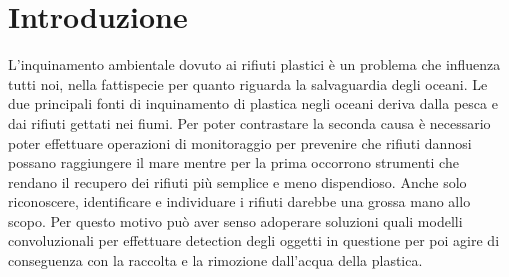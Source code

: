 \section*{Introduzione}

L'inquinamento ambientale dovuto ai rifiuti plastici è un problema che influenza tutti noi, nella fattispecie per quanto riguarda la salvaguardia 
degli oceani. Le due principali fonti di inquinamento di plastica negli oceani deriva dalla pesca e dai rifiuti gettati nei fiumi. 
Per poter contrastare la seconda causa è necessario poter effettuare operazioni di monitoraggio per prevenire che rifiuti dannosi 
possano raggiungere il mare mentre per la prima occorrono strumenti che rendano il recupero dei rifiuti più semplice e meno dispendioso. 
Anche solo riconoscere, identificare e individuare i rifiuti darebbe una grossa mano allo scopo. Per questo motivo può aver senso adoperare soluzioni 
quali modelli convoluzionali per effettuare detection degli oggetti in questione per poi agire di conseguenza con la raccolta e 
la rimozione dall'acqua della plastica.